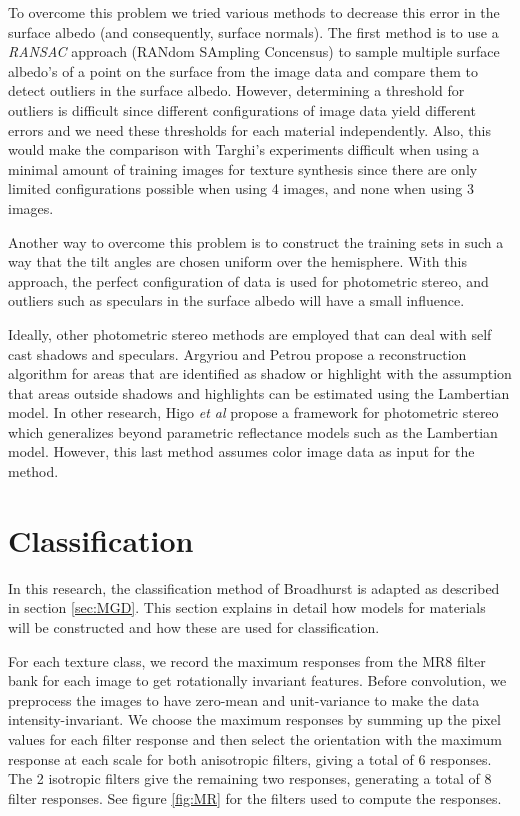 To overcome this problem we tried various methods to decrease this error in the surface albedo (and consequently, surface normals). The first method is to use a {\it RANSAC} approach (RANdom SAmpling Concensus) to sample multiple surface albedo's of a point on the surface from the image data and compare them to detect outliers in the surface albedo. However, determining a threshold for outliers is difficult since different configurations of image data yield different errors and we need these thresholds for each material independently. Also, this would make the comparison with Targhi's experiments difficult when using a minimal amount of training images for texture synthesis since there are only limited configurations possible when using 4 images, and none when using 3 images. 

Another way to overcome this problem is to construct the training sets in such a way that the tilt angles are chosen uniform over the hemisphere. With this approach, the perfect configuration of data is used for photometric stereo, and outliers such as speculars in the surface albedo will have a small influence.

Ideally, other photometric stereo methods are employed that can deal with self cast shadows and speculars. Argyriou and Petrou \cite{RecursivePS} propose a reconstruction algorithm for areas that are identified as shadow or highlight with the assumption that areas outside shadows and highlights can be estimated using the Lambertian model. In other research, Higo {\it et al} \cite{ConsensusPS} propose a framework for photometric stereo which generalizes beyond parametric reflectance models such as the Lambertian model. However, this last method assumes color image data as input for the method.

\section{Classification}\label{sec:Classification}

In this research, the classification method of Broadhurst is adapted as described in section \ref{sec:MGD}. This section explains in detail how models for materials will be constructed and how these are used for classification.

For each texture class, we record the maximum responses from the MR8 filter bank for each image to get rotationally invariant features. Before convolution, we preprocess the images to have zero-mean and unit-variance to make the data intensity-invariant. We choose the maximum responses by summing up the pixel values for each filter response and then select the orientation with the maximum response at each scale for both anisotropic filters, giving a total of 6 responses. The 2 isotropic filters give the remaining two responses, generating a total of 8 filter responses. See figure \ref{fig:MR} for the filters used to compute the responses.

